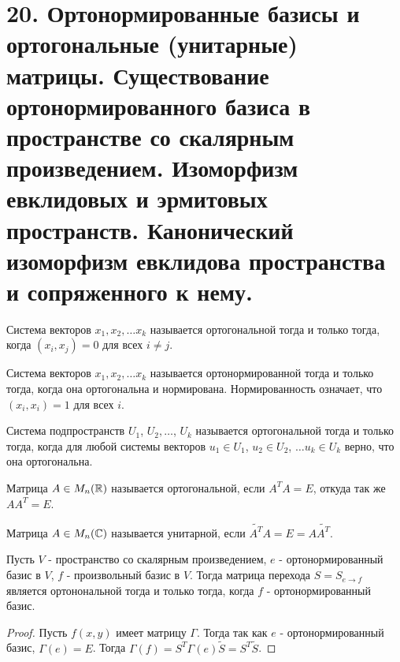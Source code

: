 \section{20. Ортонормированные базисы и ортогональные (унитарные) матрицы. Существование ортонормированного базиса в пространстве со скалярным произведением. Изоморфизм евклидовых и эрмитовых пространств. Канонический изоморфизм евклидова пространства и сопряженного к нему.}

\begin{definition}
    Система векторов $x_1, x_2, \dots x_k$ называется ортогональной тогда и только тогда, когда 
    $(x_i, x_j) = 0$ для всех $i \neq j$.
\end{definition}

\begin{definition}
    Система векторов $x_1, x_2, \dots x_k$ называется ортонормированной тогда и только тогда, когда 
    она ортогональна и нормирована. Нормированность означает, что $(x_i, x_i) = 1$ для всех $i$.
\end{definition}

\begin{definition}
    Система подпространств $U_1$, $U_2, \dots$, $U_k$ называется ортогональной тогда и только тогда,
    когда для любой системы векторов $u_1 \in U_1$, $u_2 \in U_2$, $\dots u_k \in U_k$ верно, 
    что она ортогональна.
\end{definition}

\begin{definition}
    Матрица $A \in M_n(\mathbb{R})$ называется ортогональной, если $A^T A = E$, откуда так же $A A^T = E$.
\end{definition}

\begin{definition}
    Матрица $A \in M_n(\mathbb{C})$ называется унитарной, если $\tilde{A^T} A = E = A \tilde{A^T}$.
\end{definition}
 
\begin{proposition}
    Пусть $V$ - пространство со скалярным произведением, $e$ - ортонормированный базис в $V$, 
    $f$ - произвольный базис в $V$. Тогда матрица перехода $S = S_{e \to f}$ является 
    ортонональной тогда и только тогда, когда $f$ - ортонормированный базис.
\end{proposition}

\begin{proof}
    Пусть $f(x, y)$ имеет матрицу $\Gamma$. Тогда так как $e$ - ортонормированный базис, $\Gamma(e) = E$.
    Тогда $\Gamma(f) = S^T \Gamma(e) \tilde{S} = S^T \tilde{S}$.
\end{proof}

